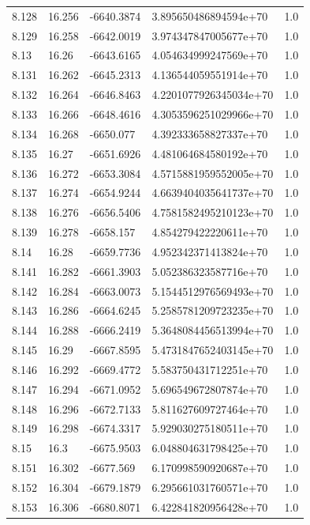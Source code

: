 \begin{tabular}{lllll}
8.128 & 16.256 & -6640.3874 & 3.895650486894594e+70 & 1.0 \\
8.129 & 16.258 & -6642.0019 & 3.974347847005677e+70 & 1.0 \\
8.13 & 16.26 & -6643.6165 & 4.054634999247569e+70 & 1.0 \\
8.131 & 16.262 & -6645.2313 & 4.136544059551914e+70 & 1.0 \\
8.132 & 16.264 & -6646.8463 & 4.2201077926345034e+70 & 1.0 \\
8.133 & 16.266 & -6648.4616 & 4.3053596251029966e+70 & 1.0 \\
8.134 & 16.268 & -6650.077 & 4.392333658827337e+70 & 1.0 \\
8.135 & 16.27 & -6651.6926 & 4.481064684580192e+70 & 1.0 \\
8.136 & 16.272 & -6653.3084 & 4.5715881959552005e+70 & 1.0 \\
8.137 & 16.274 & -6654.9244 & 4.6639404035641737e+70 & 1.0 \\
8.138 & 16.276 & -6656.5406 & 4.7581582495210123e+70 & 1.0 \\
8.139 & 16.278 & -6658.157 & 4.854279422220611e+70 & 1.0 \\
8.14 & 16.28 & -6659.7736 & 4.952342371413824e+70 & 1.0 \\
8.141 & 16.282 & -6661.3903 & 5.052386323587716e+70 & 1.0 \\
8.142 & 16.284 & -6663.0073 & 5.1544512976569493e+70 & 1.0 \\
8.143 & 16.286 & -6664.6245 & 5.2585781209723235e+70 & 1.0 \\
8.144 & 16.288 & -6666.2419 & 5.3648084456513994e+70 & 1.0 \\
8.145 & 16.29 & -6667.8595 & 5.4731847652403145e+70 & 1.0 \\
8.146 & 16.292 & -6669.4772 & 5.583750431712251e+70 & 1.0 \\
8.147 & 16.294 & -6671.0952 & 5.696549672807874e+70 & 1.0 \\
8.148 & 16.296 & -6672.7133 & 5.811627609727464e+70 & 1.0 \\
8.149 & 16.298 & -6674.3317 & 5.929030275180511e+70 & 1.0 \\
8.15 & 16.3 & -6675.9503 & 6.048804631798425e+70 & 1.0 \\
8.151 & 16.302 & -6677.569 & 6.170998590920687e+70 & 1.0 \\
8.152 & 16.304 & -6679.1879 & 6.295661031760571e+70 & 1.0 \\
8.153 & 16.306 & -6680.8071 & 6.422841820956428e+70 & 1.0 \\

\end{tabular}
